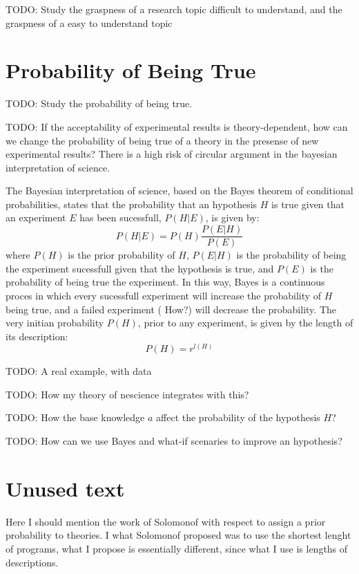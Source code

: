 {\color{red} TODO: Study the graspness of a research topic difficult to understand, and the graspness of a easy to understand topic}

%
%

\section{Probability of Being True}

{\color{red} TODO: Study the probability of being true.}

{\color{red} TODO: If the acceptability of experimental results is theory-dependent, how can we change the probability of being true of a theory in the presense of new experimental results? There is a high risk of circular argument in the bayesian interpretation of science.}

The Bayesian interpretation of science, based on the Bayes theorem of conditional probabilities, states that the probability that an hypothesis $H$ is true given that an experiment $E$ has been sucessfull, $P(H|E)$, is given by:
\[
P(H|E) = P(H) \frac{ P(E|H) }{ P(E) }
\]
where $P(H)$ is the prior probability of $H$, $P(E|H)$ is the probability of being the experiment sucessfull given that the hypothesis is true, and $P(E)$ is the probability of being true the experiment. In this way, Bayes is a continuous proces in which every sucessfull experiment will increase the probability of $H$ being true, and a failed experiment ({\color{red} How?}) will decrease the probability. The very initian probability $P(H)$, prior to any experiment, is given by the length of its description:
\[
P(H) = r^{l(H)}
\]

\begin{example}
{\color{red} TODO: A real example, with data}
\end{example}

{\color{red} TODO: How my theory of nescience integrates with this?}

{\color{red} TODO: How the base knowledge $a$ affect the probability of the hypothesis $H$?}

{\color{red} TODO: How can we use Bayes and what-if scenaries to improve an hypothesis?}

\section{Unused text}

Here I should mention the work of Solomonof with respect to assign a prior probability to theories. I what Solomonof proposed was to use the shortest lenght of programs, what I propose is essentially different, since what I use is lengths of descriptions.

